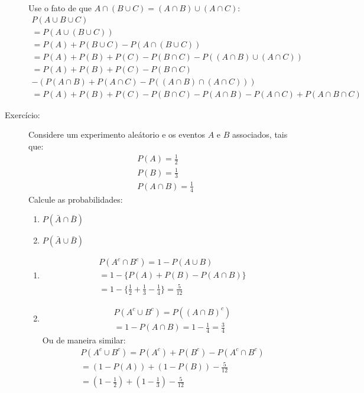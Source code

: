 \begin{description}
    Use o fato de que $A\cap (B \cup C )= (A\cap B )\cup (A \cap C )$:
    \begin{align*}
      P\left(A\cup B\cup C \right)\\
     = P\left(A \cup \left(B \cup C\right) \right)\\
      =P(A)+P(B\cup C)- P\left(A\cap \left(B\cup C \right) \right)\\
      =P(A)+P(B)+P(C)-P(B\cap C)- P\left((A \cap B)\cup (A \cap C)\right)\\
      =P(A)+P(B)+P(C)-P(B\cap C)\\
      - \left( P \left(A \cap B \right)+ P\left(A \cap C \right)-P\left(\left(A \cap B \right) \cap \left(A \cap C \right) \right) \right) \\
      =P(A)+P(B)+P(C)-P(B\cap C)- P(A \cap B)- P(A \cap C)+ P(A \cap B \cap C)
    \end{align*}

  \item [Exercício:]  Considere um experimento aleátorio e os eventos $A$ e $B$ associados, tais que:
    \begin{align*}
      P(A)= \frac{1}{2}\\
      P(B)= \frac{1}{3}\\
      P(A \cap B)= \frac{1}{4}
    \end{align*}
    Calcule as probabilidades:
    \begin{enumerate}[label=(\alph*)]
      \item $ P(\bar{A} \cap \bar{B})$
      \item $P(\bar{A} \cup \bar{B})$
    \end{enumerate}
    \begin{enumerate}[label=(\alph*)]
      \item \begin{align*}
          P(A^c \cap B^c) = 1- P(A \cup B) \\
          = 1- \{ P(A) + P(B) - P(A \cap B) \} \\
          =1 - \{ \frac{1}{2} + \frac{1}{3} -\frac{1}{4}\}= \frac{5}{12}
        \end{align*}
          \item \begin{align*}
          P(A^c \cup B^c) = P\left( \left( A \cap B\right)^c \right)\\
          = 1- P(A \cap B) = 1 - \frac{1}{4}= \frac{3}{4}
        \end{align*}  
        Ou de maneira similar:
        \begin{align*}
          P(A^c \cup B^c) = P(A^c) + P(B^c ) - P(A^c \cap B^c) \\
          = (1- P(A)) + (1- P(B)) - \frac{5}{12} \\
          = (1 - \frac{1}{2})+ (1 - \frac{1}{3})- \frac{5}{12}
        \end{align*}


\end{enumerate}
\end{description}
